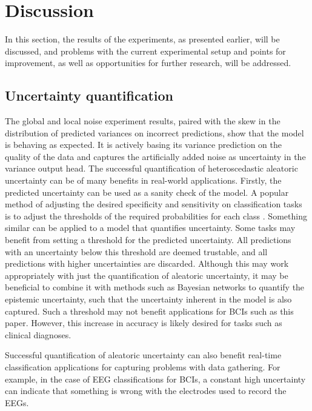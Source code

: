 \section{Discussion}\label{sec:discussion}

In this section, the results of the experiments, as presented earlier, will be discussed, and problems with the current experimental setup and points for improvement, as well as opportunities for further research, will be addressed.

\subsection{Uncertainty quantification}

The global and local noise experiment results, paired with the skew in the distribution of predicted variances on incorrect predictions, show that the model is behaving as expected. It is actively basing its variance prediction on the quality of the data and captures the artificially added noise as uncertainty in the variance output head. The successful quantification of heteroscedastic aleatoric uncertainty can be of many benefits in real-world applications. Firstly, the predicted uncertainty can be used as a sanity check of the model. A popular method of adjusting the desired specificity and sensitivity on classification tasks is to adjust the thresholds of the required probabilities for each class \citep{chen2006decision}. Something similar can be applied to a model that quantifies uncertainty. Some tasks may benefit from setting a threshold for the predicted uncertainty. All predictions with an uncertainty below this threshold are deemed trustable, and all predictions with higher uncertainties are discarded. Although this may work appropriately with just the quantification of aleatoric uncertainty, it may be beneficial to combine it with methods such as Bayesian networks to quantify the epistemic uncertainty, such that the uncertainty inherent in the model is also captured. Such a threshold may not benefit applications for BCIs such as this paper. However, this increase in accuracy is likely desired for tasks such as clinical diagnoses.

Successful quantification of aleatoric uncertainty can also benefit real-time classification applications for capturing problems with data gathering. For example, in the case of EEG classifications for BCIs, a constant high uncertainty can indicate that something is wrong with the electrodes used to record the EEGs.

